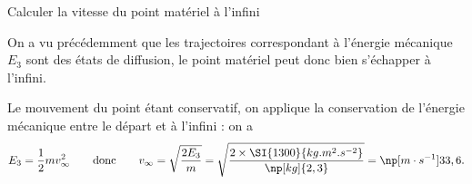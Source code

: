 \begin{enonce}
Calculer la vitesse du point matériel à l'infini
\end{enonce}


\begin{corrige}
On a vu précédemment que les trajectoires correspondant à l'énergie mécanique $E_3$ sont des états de diffusion, le point matériel peut donc bien s'échapper à l'infini.

Le mouvement du point étant conservatif, on applique la conservation de l'énergie mécanique entre le départ et  à l'infini : on a
\[
E_3 = \frac{1}{2}mv_\infty^2 
\qquad\text{donc}\qquad
 v_\infty = \sqrt{\frac{2E_3}{m}} = \sqrt{\frac{2\times \SI{1300}{kg.m^{2}.s^{-2}}}{\np[kg]{2,3}}} = \np[m \cdot s^{-1}]{33,6}.
\]
\end{corrige}


\finEntrainement







\afficheReponsesMelangees

\finFicheEntrainement                                                                        %


\ifdefined\mainIsLoaded\else
\printReponsesEtCorriges
\fi
